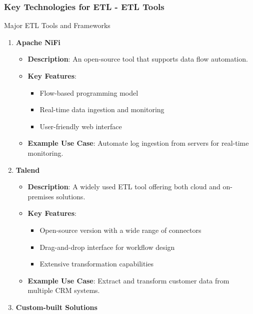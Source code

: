\documentclass[aspectratio=169]{beamer}
\begin{document}
\begin{frame}[fragile]
    \frametitle{Key Technologies for ETL - ETL Tools}
    \begin{block}{Major ETL Tools and Frameworks}
        \begin{enumerate}
            \item \textbf{Apache NiFi}
                \begin{itemize}
                    \item \textbf{Description}: An open-source tool that supports data flow automation.
                    \item \textbf{Key Features}:
                        \begin{itemize}
                            \item Flow-based programming model
                            \item Real-time data ingestion and monitoring
                            \item User-friendly web interface
                        \end{itemize}
                    \item \textbf{Example Use Case}: Automate log ingestion from servers for real-time monitoring.
                \end{itemize}
            \item \textbf{Talend}
                \begin{itemize}
                    \item \textbf{Description}: A widely used ETL tool offering both cloud and on-premises solutions.
                    \item \textbf{Key Features}:
                        \begin{itemize}
                            \item Open-source version with a wide range of connectors
                            \item Drag-and-drop interface for workflow design
                            \item Extensive transformation capabilities
                        \end{itemize}
                    \item \textbf{Example Use Case}: Extract and transform customer data from multiple CRM systems.
                \end{itemize}
            \item \textbf{Custom-built Solutions}
                \begin{itemize}

\end{itemize}
\end{enumerate}
\end{block}
\end{frame}
\end{document}
